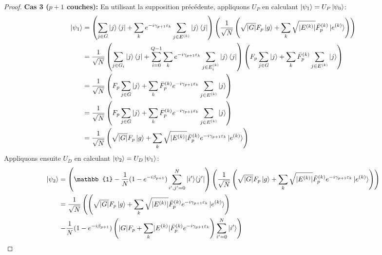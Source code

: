 \begin{proof}
\newpage
\textbf{Cas 3 ($p+1$ couches):}
En utilisant la supposition précédente, appliquons $U_{P}$ en calculant $\ket{\psi_{1}} = U_{P} \ket{\psi_{0}}$:
\begin{equation}
\begin{aligned}
\ket{\psi_{1}} & = \left(\sum_{j \in G} \ket{j}\bra{j} + \sum_{k} e^{-i \gamma_{p+1} \varepsilon_{k}} \sum_{j \in E^{(k)}} \ket{j}\bra{j} \right) \left( \frac{1}{\sqrt{ N }} \left( \sqrt{ \lvert G \rvert } F_{p} \ket{g} + \sum_{k} \sqrt{ \lvert E^{(k)} \rvert } \bar{F}^{(k)}_{p} \ket{e^{(k)}} \right) \right) \\
& = \frac{1}{\sqrt{ N }} \left( \sum_{j \in G_{i}} \ket{j}\bra{j} + \sum_{i=0}^{Q-1} \sum_{k} e^{-i \gamma_{p+1} \varepsilon_{k}} \sum_{j \in E^{(k)}_{i}} \ket{j}\bra{j} \right) \left( F_{p} \sum_{j \in G} \ket{j} + \sum_{k} \bar{F}^{(k)}_{p} \sum_{j \in E^{(k)}}\ket{j} \right) \\
& = \frac{1}{\sqrt{ N }} \left( F_{p} \sum_{j \in G}\ket{j}  + \sum_{k} \bar{F}^{(k)}_{p} e^{-i \gamma_{p+1} \varepsilon_{k}} \sum_{j \in E^{(k)}} \ket{j} \right) \\
& = \frac{1}{\sqrt{ N }} \left(  F_{p} \sum_{j \in G} \ket{j} + \sum_{k} \bar{F}^{(k)}_{p} e^{-i \gamma_{p+1} \varepsilon_{k}} \sum_{j \in E^{(k)}} \ket{j} \right)  \\
& = \frac{1}{\sqrt{ N }} \left( \sqrt{ \lvert G \rvert  } F_{p} \ket{g} + \sum_{k} \sqrt{ \lvert E^{(k)} \rvert  }\bar{F}^{(k)}_{p} e^{-i \gamma_{p+1} \varepsilon_{k}} \ket{e^{(k)}} \right) \\
\end{aligned}
\end{equation}
Appliquons ensuite $U_{D}$ en calculant $\ket{\psi_{2}}=U_{D}\ket{\psi_{1}}$:
\begin{equation}
\begin{aligned}
\ket{\psi_{2}} &= \left( \mathbb{1} - \frac{1}{N} (1 - e^{-i\beta_{p+1}}) \sum_{i',j'=0}^{N} \ket{i'}\!\bra{j'} \right) \left( \frac{1}{\sqrt{ N }} \left( \sqrt{ \lvert G \rvert  } F_{p} \ket{g} + \sum_{k} \sqrt{ \lvert E^{(k)} \rvert  }\bar{F}^{(k)}_{p} e^{-i \gamma_{p+1} \varepsilon_{k}} \ket{e^{(k)}} \right) \right) \\
&= \frac{1}{\sqrt{ N }} \left( \left( \sqrt{ \lvert G \rvert  } F_{p} \ket{g} + \sum_{k} \sqrt{ \lvert E^{(k)} \rvert  }\bar{F}^{(k)}_{p} e^{-i \gamma_{p+1} \varepsilon_{k}} \ket{e^{(k)}} \right) \right. \\
& \left. - \frac{1}{N} (1 - e^{-i\beta_{p+1}}) \left(  \lvert G \rvert F_{p} + \sum_{k} \lvert E^{(k)} \rvert \bar{F}^{(k)}_{p} e^{-i \gamma_{p+1} \varepsilon_{k}}\right) \sum_{i'=0}^{N} \ket{i'} \right) \\

\end{aligned}
\end{equation}
\end{proof}
